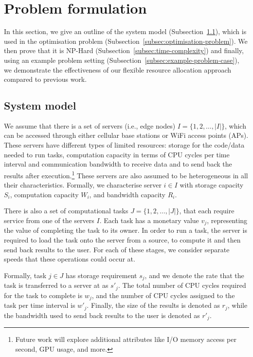 \section{Problem formulation}
\label{sec:problem-formulation}
In this section, we give an outline of the system model (Subsection~\ref{subsec:system-model}), which is used in the optimisation problem (Subsection~\ref{subsec:optimisation-problem}). We then prove that it is NP-Hard (Subsection~\ref{subsec:time-complexity}) and finally, using an example problem setting (Subsection~\ref{subsec:example-problem-case}), we demonstrate the effectiveness of our flexible resource allocation approach compared to previous work.

\subsection{System model}
\label{subsec:system-model}
We assume that there is a set of servers (i.e., edge nodes) $I = \{1,2,\ldots,\left|I\right|\}$, which can be accessed through either cellular base stations or WiFi access points (APs). These servers have different types of limited resources: storage for the code/data needed to run tasks, computation capacity in terms of CPU cycles per time interval and communication bandwidth to receive data and to send back the results after execution.\footnote{Future work will explore additional attributes like I/O memory access per second, GPU usage, and more.} These servers are also assumed to be heterogeneous in all their characteristics. Formally, we characterise server $i \in I$ with storage capacity $S_i$, computation capacity $W_i$, and bandwidth capacity $R_i$.

There is also a set of computational tasks $J = \{1,2,\ldots, \left| J \right|\}$, that each require service from one of the servers $I$. Each task has a monetary value $v_j$, representing the value of completing the task to its owner. In order to run a task, the server is required to load the task onto the server from a source, to compute it and then send back results to the user. For each of these stages, we consider separate speeds that these operations could occur at.

Formally, task $j \in J$ has storage requirement $s_j$, and we denote the rate that the task is transferred to a server at as $s'_j$. The total number of CPU cycles required for the task to complete is $w_j$, and the number of CPU cycles assigned to the task per time interval is $w'_j$. Finally, the size of the results is denoted as $r_j$, while the bandwidth used to send back results to the user is denoted as $r'_j$.

